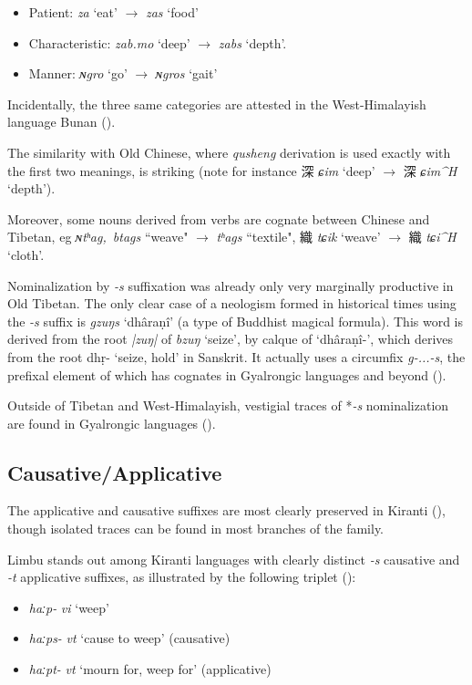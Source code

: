 \documentclass[oneside,a4paper,11pt]{article}
\newcommand{\ipa}[1]{{\phon\textit{\mbox{#1}}}}
\newcommand{\zh}[1]{{\cn#1}}
\newcommand{\ch}[3]{\zh{#1} \ipa{#2} `#3'}
\begin{document}
\begin{itemize}
\item Patient: \ipa{za} `eat' $\rightarrow$ \ipa{zas} `food' 
\item Characteristic: \ipa{zab.mo} `deep'  $\rightarrow$ \ipa{zabs} `depth'.
\item Manner: \ipa{ɴgro} `go'  $\rightarrow$ \ipa{ɴgros} `gait' 
 \end{itemize}
 
Incidentally, the three same categories are attested in the West-Himalayish language Bunan (\citealt[179-180]{widmer14bunan}).

The similarity with Old Chinese, where \textit{qusheng} derivation is used exactly with the first two meanings, is striking (note for instance \ch{深}{ɕim}{deep} $\rightarrow$ \ch{深}{ɕim^H}{depth}).

Moreover, some nouns derived from verbs are cognate between Chinese and Tibetan, eg \ipa{ɴtʰag, btags} ``weave" $\rightarrow$ \ipa{tʰags} ``textile", \ch{織}{tɕik}{weave} $\rightarrow$ \ch{織}{tɕi^H}{cloth}.

Nominalization by \ipa{-s} suffixation was already only very marginally productive in Old Tibetan. The only clear case of a neologism formed in historical times using the \ipa{-s} suffix is \ipa{gzuŋs} `dhâraṇî' (a type of Buddhist magical formula). This word is derived from the root \ipa{|zuŋ|} of \ipa{bzuŋ} `seize', by calque of `dhâraṇî-', which derives from the root dhṛ- `seize, hold' in Sanskrit. It actually uses a circumfix \ipa{g-...-s}, the prefixal element of which has cognates in Gyalrongic languages and beyond (\citealt{konnerth16gV, jacques14snom}).

Outside of Tibetan and West-Himalayish, vestigial traces of *\ipa{-s} nominalization are found in Gyalrongic languages (\citealt{jacques03s.houzhui, jackson14morpho}).

 \subsection{Causative/Applicative} \label{sec:causative}
The applicative and causative suffixes are most clearly preserved in Kiranti (\citealt{michailovsky85dental, jacques15derivational.khaling}), though isolated traces can be found in most branches of the family.

Limbu stands out among Kiranti languages with clearly distinct \ipa{-s} causative and \ipa{-t} applicative suffixes, as illustrated by the following triplet (\citealt{michailovsky02dico}):
\begin{itemize}
\item \ipa{haːp-} \textit{vi} `weep'
\item \ipa{haːps-} \textit{vt} `cause to weep' (causative)
\item \ipa{haːpt-} \textit{vt} `mourn for, weep for' (applicative)
\end{itemize}
\end{document}
